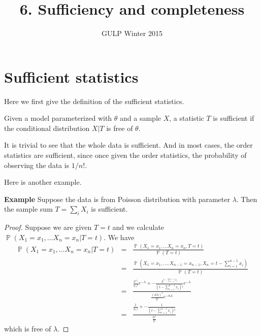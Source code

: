 \documentclass[12pt]{article}
\newcommand{\1}{\mathbbm{1}}
\renewcommand{\P}{\operatorname{\mathbb{P}}}
\newenvironment{definition}[1][Definition]{\begin{trivlist}
\item[\hskip \labelsep {\bfseries #1}]}{\end{trivlist}}
\begin{document}
\title{6. Sufficiency and completeness}%
\author{GULP Winter 2015} %
\maketitle

\section{Sufficient statistics}

Here we first give the definition of the sufficient statistics.

\begin{definition}
 Given a model parameterized with $\theta$ and a sample $X$, a statistic $T$ is sufficient if the conditional distribution $X|T$ is free of $\theta$. 
\end{definition}

It is trivial to see that the whole data is sufficient. And in most cases, the order statistics are sufficient, since once given the order statistics, the probability of observing the data is $1/n!$. 

Here is another example.

\textbf{Example} Suppose the data is from Poisson distribution with parameter $\lambda$. Then the sample sum $T = \sum_i X_i$ is sufficient.

\begin{proof}
Suppose we are given $T =t$ and we calculate $\P (X_1 = x_1, \ldots X_n =x_n| T=t)$. We have
\begin{eqnarray*}
\P (X_1 = x_1, \ldots X_n =x_n| T=t) &=&  \frac{ \P (X_1 = x_1, \ldots X_n =x_n, T=t) }{\P (T = t)}\\& = & \frac{ \P (X_1 = x_1, \ldots,X_{n-1} = x_{n-1}, X_n =t  - \sum_{i=1}^{n-1} x_i ) }{\P (T = t)} \\ & = &  \frac{\frac{\lambda^{x_1}}{x_1 !} e^{-\lambda} \times \cdots \frac{\lambda^{t  - \sum_{i=1}^{n-1} x_i}}{(t  - \sum_{i=1}^{n-1} x_i)!} e^{-\lambda}}{\frac{(n\lambda)^t}{t!} e^{-n\lambda}} \\ &=& \frac{\frac{1}{x_1 !}  \times \cdots \frac{1}{(t  - \sum_{i=1}^{n-1} x_i)!}} {\frac{n^t}{t!}}
\end{eqnarray*}
which is free of $\lambda$.
\end{proof}
\end{document}
